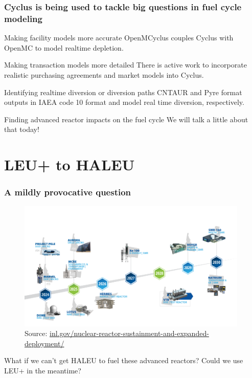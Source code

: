 \documentclass[9pt]{beamer}
\begin{document}
  \begin{frame}
    \frametitle{Cyclus is being used to tackle big questions in fuel cycle modeling}
    \begin{block}{Making facility models more accurate}
        OpenMCyclus \cite{openmcyclus_paper} couples Cyclus with OpenMC to model realtime depletion.
    \end{block}
    \begin{block}{Making transaction models more detailed}
        There is active work to incorporate realistic purchasing agreements and market models into Cyclus.
    \end{block}
    \begin{block}{Identifying realtime diversion or diversion paths}
        CNTAUR \cite{mummah_advanced_2024} and Pyre \cite{westphal_modeling_2019} format outputs in IAEA code 10 format and model real time diversion, respectively.
    \end{block}
    \begin{block}{Finding advanced reactor impacts on the fuel cycle}
        We will talk a little about that today!
    \end{block}
  \end{frame}

  \section{LEU+ to HALEU}
  \begin{frame}
    \frametitle{A mildly provocative question}
    \vspace{-25pt}
    \begin{figure}
        \centering
        \includegraphics[width=0.98\textwidth]{./images/reactor_timeline.png}
        \caption{Source: \url{inl.gov/nuclear-reactor-sustainment-and-expanded-deployment/}}
    \end{figure}
    \vspace{-8pt}
    What if we can't get HALEU to fuel these advanced reactors?
    Could we use LEU+ in the meantime?
  \end{frame}
\end{document}
